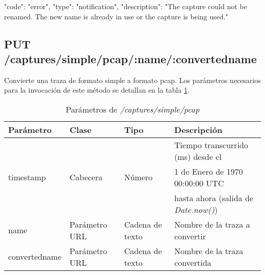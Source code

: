 \begin{itemize}
{\begin{minipage}{\textwidth}
\begin{code}[language=json]
{
  "code": "error",
  "type": "notification",
  "description": "The capture could not be renamed. The new name is already in use or the capture is being used."
}
\end{code}
\end{minipage}
}
\end{itemize}

%
%
\subsection{PUT /captures/simple/pcap/:name/:convertedname}
Convierte una \gls{traza} de formato \gls{simple} a formato \gls{pcap}. Los parámetros necesarios para la invocación de este método se detallan en la tabla \ref{extra:api:capturessimplepcap:invocacion}.

\begin{table}[H]
\centering
\begin{tabular}{|l|l|l|l|}
\hline
\rowcolor[HTML]{F5F5F5}
\textbf{Parámetro}  & \textbf{Clase} & \textbf{Tipo}   & \textbf{Descripción}                        \\ \hline
                    &                &                 & Tiempo transcurrido (ms) desde el           \\
timestamp           & Cabecera       & Número          & 1 de Enero de 1970 00:00:00 UTC             \\
                    &                &                 & hasta ahora (salida de \textit{Date.now()}) \\ \hline
name                & Parámetro URL  & Cadena de texto & Nombre de la \gls{traza} a convertir        \\ \hline
convertedname       & Parámetro URL  & Cadena de texto & Nombre de la \gls{traza} convertida         \\ \hline
\end{tabular}
\caption{Parámetros de \textit{/captures/simple/pcap}}
\label{extra:api:capturessimplepcap:invocacion}
\end{table}

